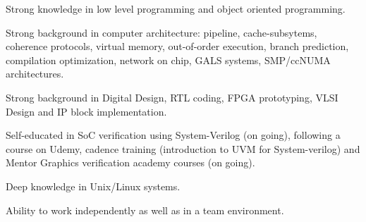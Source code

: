 
\begin{cventries}
      \begin{cvitems}
	\item {Strong knowledge in low level programming and object oriented programming.}
	\item {Strong background in computer architecture: pipeline, cache-subsytems, coherence protocols, virtual memory, out-of-order execution, branch prediction, compilation optimization, network on chip, GALS systems, SMP/ccNUMA architectures.}
	\item {Strong background in Digital Design, RTL coding, FPGA prototyping, VLSI Design and IP block implementation.}
	\item {Self-educated in SoC verification using System-Verilog (on going), following a course on Udemy, cadence training
	(introduction to UVM for System-verilog) and Mentor Graphics verification academy courses (on going).}
	\item {Deep knowledge in Unix/Linux systems.}
	\item {Ability to work independently as well as in a team environment.}
      \end{cvitems}
\end{cventries}
